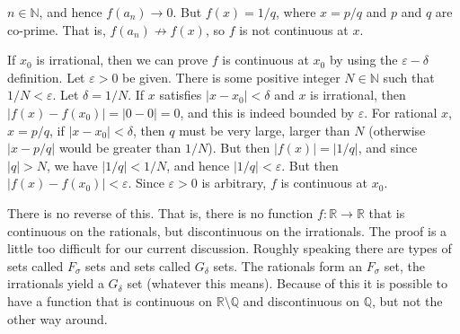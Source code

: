 \documentclass{article}
\theoremstyle{normal}
\begin{document}
            $n\in\mathbb{N}$, and hence $f(a_{n})\rightarrow{0}$.
            But $f(x)=1/q$, where $x=p/q$ and $p$ and $q$ are co-prime.
            That is, $f(a_{n})\not\rightarrow{f}(x)$, so $f$ is not continuous
            at $x$.
            \par\hfill\par
            If $x_{0}$ is irrational, then we can prove $f$ is continuous at
            $x_{0}$ by using the $\varepsilon-\delta$ definition. Let
            $\varepsilon>0$ be given. There is some positive integer
            $N\in\mathbb{N}$ such that $1/N<\varepsilon$. Let
            $\delta=1/N$. If $x$ satisfies $|x-x_{0}|<\delta$ and $x$
            is irrational, then $|f(x)-f(x_{0})|=|0-0|=0$, and this is indeed
            bounded by $\varepsilon$. For rational $x$, $x=p/q$, if
            $|x-x_{0}|<\delta$, then $q$ must be very large, larger than
            $N$ (otherwise $|x-p/q|$ would be greater than $1/N$). But then
            $|f(x)|=|1/q|$, and since $|q|>N$, we have $|1/q|<1/N$, and hence
            $|1/q|<\varepsilon$. But then $|f(x)-f(x_{0})|<\varepsilon$.
            Since $\varepsilon>0$ is arbitrary, $f$ is continuous at
            $x_{0}$.
            \par\hfill\par
            \color{black}
        \fi
        There is no reverse of this. That is, there is no function
        $f:\mathbb{R}\rightarrow\mathbb{R}$ that is continuous on the
        rationals, but discontinuous on the irrationals. The proof is
        a little too difficult for our current discussion. Roughly speaking
        there are types of sets called $F_{\sigma}$ sets and sets called
        $G_{\delta}$ sets. The rationals form an $F_{\sigma}$ set, the
        irrationals yield a $G_{\delta}$ set (whatever this means). Because of
        this it is possible to have a function that is continuous on
        $\mathbb{R}\setminus\mathbb{Q}$ and discontinuous on $\mathbb{Q}$,
        but not the other way around.
        \par\hfill\par
\end{document}
